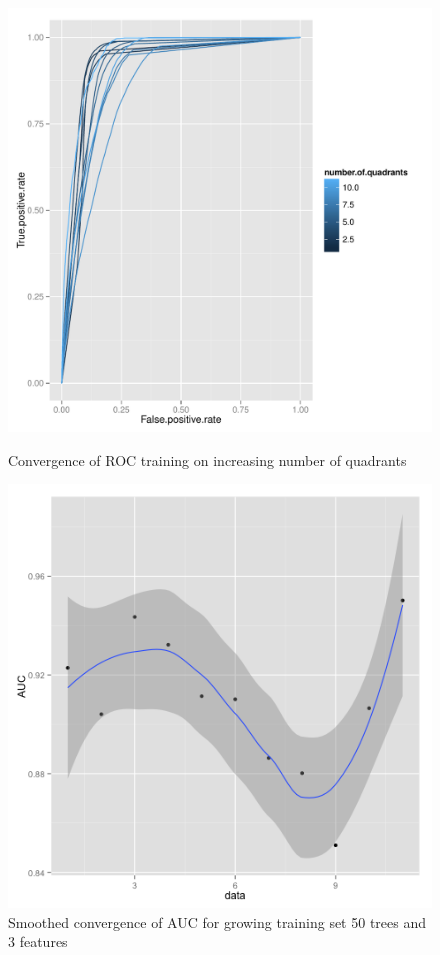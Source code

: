 \documentclass{article}\usepackage[]{graphicx}\usepackage[]{color}
\begin{document}
\begin{figure}[H]
  \includegraphics[width=\linewidth, height = 180pts]{ROC_converge1.pdf}
    \caption{Convergence of ROC training on increasing number of quadrants}\label{}
\endminipage
{}

\includegraphics[width=\linewidth, height = 180pts]{AUCconverge.png}
  \caption{Smoothed convergence of AUC for growing training set 50 trees and 3 features}\label{}
\endminipage

  \end{figure}
  
\end{document}
